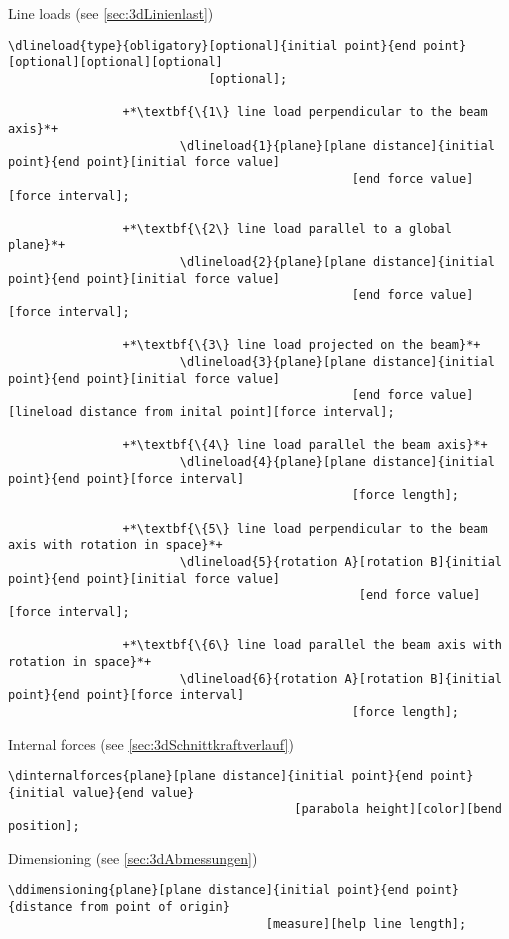 \documentclass[%
  a4paper,
  BCOR20mm,
  pointlessnumbers,
  twoside,
  halfparskip,
  openright,
]{scrreprt}
\begin{document}
Line loads (see \ref{sec:3dLinienlast})

\begin{lstlisting}[emph={dlineload},backgroundcolor=\color{white}]
		\dlineload{type}{obligatory}[optional]{initial point}{end point}[optional][optional][optional]
							[optional];
		
				+*\textbf{\{1\} line load perpendicular to the beam axis}*+
						\dlineload{1}{plane}[plane distance]{initial point}{end point}[initial force value]
												[end force value][force interval];
						
				+*\textbf{\{2\} line load parallel to a global plane}*+
						\dlineload{2}{plane}[plane distance]{initial point}{end point}[initial force value]
												[end force value][force interval];
						
				+*\textbf{\{3\} line load projected on the beam}*+
						\dlineload{3}{plane}[plane distance]{initial point}{end point}[initial force value]
												[end force value][lineload distance from inital point][force interval];
						
				+*\textbf{\{4\} line load parallel the beam axis}*+
						\dlineload{4}{plane}[plane distance]{initial point}{end point}[force interval]
												[force length];
						
				+*\textbf{\{5\} line load perpendicular to the beam axis with rotation in space}*+
						\dlineload{5}{rotation A}[rotation B]{initial point}{end point}[initial force value]
												 [end force value][force interval];
						
				+*\textbf{\{6\} line load parallel the beam axis with rotation in space}*+
						\dlineload{6}{rotation A}[rotation B]{initial point}{end point}[force interval]
												[force length];
\end{lstlisting}\vspace{-10mm}

Internal forces (see \ref{sec:3dSchnittkraftverlauf})

\begin{lstlisting}[emph={dinternalforces},backgroundcolor=\color{white}]
		\dinternalforces{plane}[plane distance]{initial point}{end point}{initial value}{end value}
										[parabola height][color][bend position];
\end{lstlisting}\vspace{-10mm}

Dimensioning (see \ref{sec:3dAbmessungen})

\begin{lstlisting}[emph={ddimensioning},backgroundcolor=\color{white}]
		\ddimensioning{plane}[plane distance]{initial point}{end point}{distance from point of origin}
									[measure][help line length];
\end{lstlisting}\vspace{-10mm}
\end{document}
